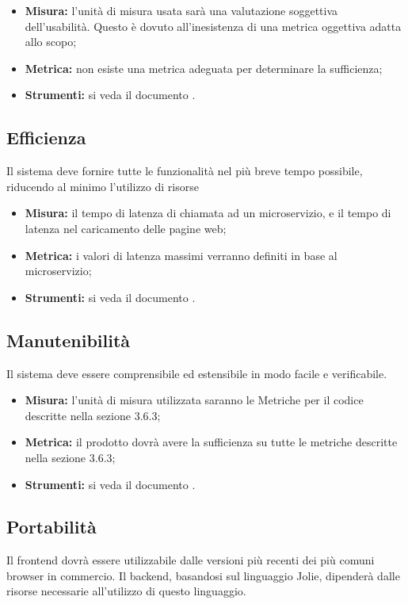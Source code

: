 		\begin{itemize}
			\item \textbf{Misura: }l’unità di misura usata sarà una valutazione soggettiva dell’usabilità. Questo
			è dovuto all’inesistenza di una metrica oggettiva adatta allo scopo;
			\item \textbf{Metrica: }non esiste una metrica adeguata per determinare la sufficienza;
			\item \textbf{Strumenti: }si veda il documento \NdP.
			
		\end{itemize}
	
	\subsection{Efficienza}
		Il sistema deve fornire tutte le funzionalità nel più breve tempo possibile, riducendo al minimo l’utilizzo di risorse
		
		\begin{itemize}
			\item \textbf{Misura: }il tempo di latenza di chiamata ad un microservizio, e il tempo di latenza nel caricamento delle pagine web;
			\item \textbf{Metrica: }i valori di latenza massimi verranno definiti in base al microservizio;
			\item \textbf{Strumenti: }si veda il documento \NdP.
			
		\end{itemize}
	
	\subsection{Manutenibilità}
		Il sistema deve essere comprensibile ed estensibile in modo facile e verificabile.
		
		\begin{itemize}
			\item \textbf{Misura: }l’unità di misura utilizzata saranno le Metriche per il codice descritte nella sezione 3.6.3;
			\item \textbf{Metrica: }il prodotto dovrà avere la sufficienza su tutte le metriche descritte nella sezione 3.6.3;
			\item \textbf{Strumenti: }si veda il documento \NdP.
			
		\end{itemize}
	
	\subsection{Portabilità}
		Il frontend dovrà essere utilizzabile dalle versioni più recenti dei più comuni browser in commercio. 
		Il backend, basandosi sul linguaggio Jolie, dipenderà dalle risorse necessarie all’utilizzo di questo linguaggio.
		
